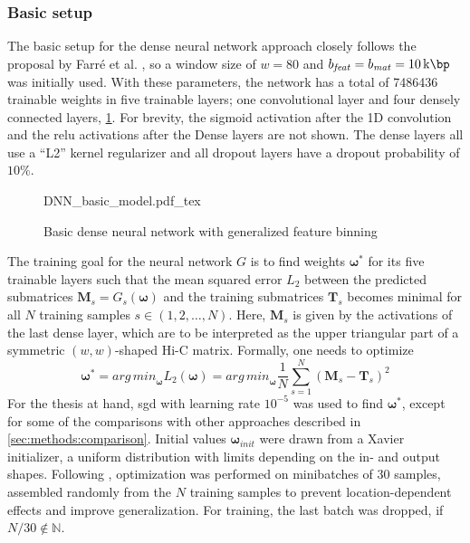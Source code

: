 \subsubsection{Basic setup} \label{sec:methods:basicSetup}
The basic setup for the dense neural network approach closely follows the proposal by Farr\'e et al. \cite{Farre2018a},
so a window size of $w=80$ and $b_\mathit{feat}=b_\mathit{mat} = \SI{10}{\kilo\bp}$ was initially used.
With these parameters, the network has a total of \SI{7486436}{} trainable weights in five trainable layers; 
one convolutional layer and four densely connected layers, \cref{fig:methods:basic_dnn}.
For brevity, the sigmoid activation after the 1D convolution and the \acrshort{relu} activations after the Dense layers are not shown.
The dense layers all use a ``L2'' kernel regularizer and all dropout layers have a dropout probability of $10\%$.
\begin{figure}[htb]
    \small
    \centering
    {DNN_basic_model.pdf_tex}
    \caption{Basic dense neural network with generalized feature binning}
    \label{fig:methods:basic_dnn}
\end{figure}

The training goal for the neural network $G$ is to find weights $\bm{\omega}^*$ for its five trainable layers 
such that the mean squared error $L_2$ between the predicted submatrices $\mathbf{M}_s = G_s(\bm{\omega})$ 
and the training submatrices $\mathbf{T}_s$ becomes minimal for all $N$ training samples $s \in (1,2,\dots, N)$. 
Here, $\mathbf{M}_s$ is given by the activations of the last dense layer, which are to be interpreted as the upper triangular 
part of a symmetric $(w, w)$-shaped Hi-C matrix.
Formally, one needs to optimize
\begin{equation}
 \bm{\omega}^* = \mathit{arg\,min}_{\bm{\omega}} L_2(\bm{\omega}) = 
        \mathit{arg\,min}_{\bm{\omega}} \frac{1}{N} \sum_{s=1}^N (\mathbf{M}_s - \mathbf{T}_s)^2 \label{eq:methods:nn-mse}
\end{equation} 
For the thesis at hand, \acrfull{sgd} with learning rate $10^{-5}$  was used to find $\bm{\omega}^*$,
except for some of the comparisons with other approaches described in \cref{sec:methods:comparison}.
Initial values $\bm{\omega}_\mathit{init}$ were drawn from a Xavier initializer, a uniform distribution with limits depending on the in- and output shapes.
Following \cite{Farre2018a}, optimization was performed on minibatches of 30 samples, assembled randomly from the $N$ training samples
to prevent location-dependent effects and improve generalization.
For training, the last batch was dropped, if $N/30 \not \in \mathbb{N}$. 

